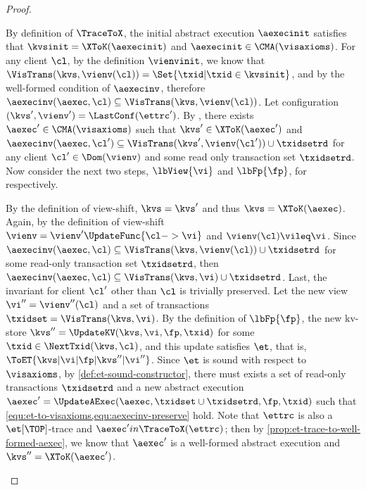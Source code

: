 \begin{proof}
\begin{enumerate}
        By definition of \( \TraceToX \), the initial abstract execution \( \aexecinit \)
        satisfies that \( \kvsinit = \XToK(\aexecinit) \) and \( \aexecinit \in \CMA(\visaxioms) \).
        For any client \( \cl \), by the definition \( \vienvinit \), we know that 
        \( \VisTrans(\kvs,\vienv(\cl)) = \Set{\txid | \txid \in \kvsinit} \),
        and by the well-formed condition of \( \aexecinv \), 
        therefore \( \aexecinv(\aexec,\cl) \subseteq \VisTrans(\kvs,\vienv(\cl)) \).
        Let configuration \( (\kvs',\vienv') = \LastConf(\ettrc') \).
        By \ih, there exists \( \aexec' \in \CMA(\visaxioms) \) such that \( \kvs' \in \XToK(\aexec') \)
        and \( \aexecinv(\aexec,\cl') \subseteq \VisTrans(\kvs',\vienv(\cl')) \cup \txidsetrd \) 
        for any client \( \cl' \in \Dom(\vienv) \) and some read only transaction set \( \txidsetrd \).
        Now consider the next two steps, \( \lbView{\vi} \) and \( \lbFp{\fp} \), for respectively.
        \begin{enumerate}
        \Case{\( \lbView{\vi} \)}
            By the definition of view-shift, \( \kvs = \kvs' \) and thus \( \kvs = \XToK(\aexec)\).
            Again, by the definition of view-shift 
            \( \vienv = \vienv'\UpdateFunc{\cl -> \vi}\) and \( \vienv(\cl) \vileq \vi \).
            Since \( \aexecinv(\aexec,\cl) \subseteq \VisTrans(\kvs,\vienv(\cl)) \cup \txidsetrd \)
            for some read-only transaction set \( \txidsetrd \),
            then \( \aexecinv(\aexec,\cl) \subseteq \VisTrans(\kvs,\vi) \cup \txidsetrd \).
            Last, the invariant for client \( \cl' \) other than \( \cl \) is trivially preserved.
        \Case{\( \lbFp{\fp} \)}
            Let the new view \( \vi'' = \vienv''(\cl) \) and 
            a set of transactions \( \txidset = \VisTrans(\kvs, \vi) \).
            By the definition of \( \lbFp{\fp} \),
            the new kv-store \( \kvs'' = \UpdateKV(\kvs,\vi,\fp,\txid) \)
            for some \( \txid \in \NextTxid(\kvs,\cl) \),
            and this update satisfies \( \et \),
            that is, \( \ToET{ \kvs | \vi | \fp | \kvs'' | \vi'' }\).
            Since \( \et \) is sound with respect to \( \visaxioms \),
            by \cref{def:et-sound-constructor},
            there must exists a set of read-only transactions \( \txidsetrd \)
            and a new abstract execution 
            \( \aexec' = \UpdateAExec(\aexec,\txidset \cup \txidsetrd, \fp, \txid) \)
            such that \cref{equ:et-to-visaxioms,equ:aexecinv-preserve} hold.
            Note that \( \ettrc \) is also a \( \et[\TOP]\)-trace and 
            \( \aexec' in \TraceToX(\ettrc) \);
            then by \cref{prop:et-trace-to-well-formed-aexec}, we know that 
            \( \aexec' \) is a well-formed abstract execution and \( \kvs'' = \XToK(\aexec') \).


\end{enumerate}
\end{enumerate}
\end{proof}
